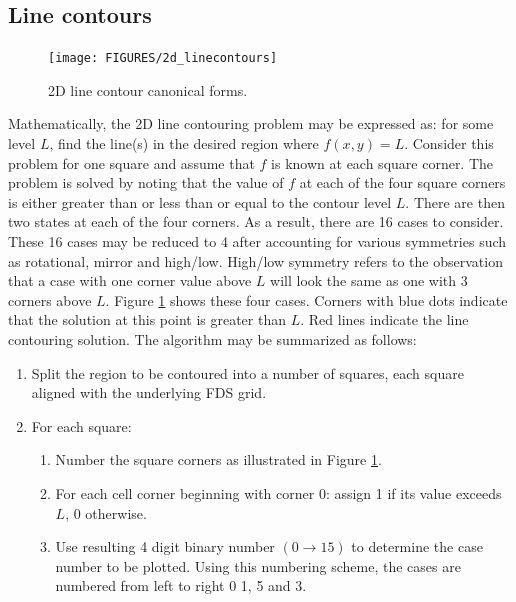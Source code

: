 \documentclass[11pt,twoside]{book}
\newcommand{\figoptions}{htp}
\begin{document}
\subsection{Line contours}
\begin{figure}[\figoptions]
\begin{center}
\texttt{[image: FIGURES/2d\_linecontours]}
\end{center}
\caption{2D line contour canonical forms.
  }
\label{fig2dline}%
\end{figure}
Mathematically, the 2D line contouring problem may be expressed as: for some level $L$, find the line(s) in the desired region where $f(x,y)=L$.  Consider this problem for one square and assume that $f$ is known at each square corner.  The problem is solved by noting that the value of $f$ at each of the four square corners is either greater than or less than or equal to the contour level $L$.  There are then two states at each of the four corners.  As a result, there are 16 cases to consider.  These 16 cases may be reduced to 4 after accounting for various symmetries such as rotational, mirror and high/low.  High/low symmetry refers to the observation that a case with one corner value above $L$ will look the same as one with 3 corners above $L$.
Figure \ref{fig2dline} shows these four cases.  Corners with blue dots indicate that the solution at this point is greater than $L$.  Red lines indicate the line contouring solution.  The algorithm may be summarized as follows:
\begin{enumerate}
\item Split the region to be contoured into a number of squares, each square aligned with the underlying FDS grid.
\item For  each square:
\begin{enumerate}
\item Number the square corners as illustrated in Figure \ref{fig2dline}.
\item For each cell corner beginning with corner 0: assign 1 if its value exceeds $L$, 0 otherwise.
\item Use resulting 4 digit binary number $(0\rightarrow 15)$ to determine the case number to be plotted.  Using this numbering scheme, the cases are numbered from left to right 0 1, 5 and 3.
\end{enumerate}
\end{enumerate}
\end{document}
